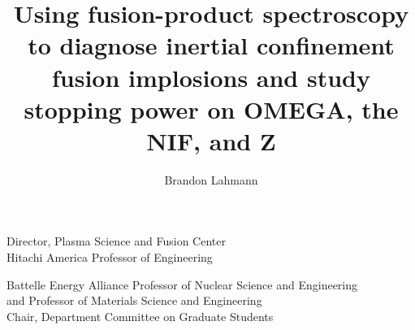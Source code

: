 \title{Using fusion-product spectroscopy to diagnose inertial confinement fusion implosions and study stopping power on OMEGA, the NIF, and Z}


\author{Brandon Lahmann}



{
Director, Plasma Science and Fusion Center \\
Hitachi America Professor of Engineering
}

{
Battelle Energy Alliance Professor of Nuclear Science and Engineering\\
and Professor of Materials Science and Engineering \\ 
Chair, Department Committee on Graduate Students
}

\maketitle